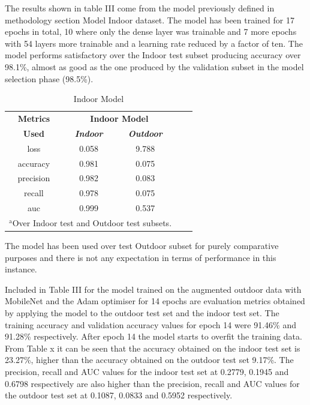 \documentclass[conference]{IEEEtran}
\begin{document}
The results shown in table III come from the model previously defined in methodology section Model Indoor dataset. The model has been trained for 17 epochs in total, 10 where only the dense layer was trainable and 7 more epochs with 54 layers more trainable and a learning rate reduced by a factor of ten. The model performs satisfactory over the Indoor test subset producing accuracy over 98.1\%, almost as good as the one produced by the validation subset in the model selection phase (98.5\%).   

\begin{table}[htbp]
\caption{Indoor Model}
\begin{center}
\begin{tabular}{|c|c|c|c|c|}
\hline
\textbf{Metrics}&\multicolumn{2}{|c|}{\textbf{Indoor Model}} \\
\cline{2-3} 
\textbf{Used} & \textbf{\textit{Indoor}}& \textbf{\textit{Outdoor}} \\
\hline
loss &0.058&9.788  \\
\hline
accuracy &0.981&0.075 \\
\hline
precision &0.982&0.083 \\
\hline
recall &0.978&0.075 \\
\hline
auc &0.999&0.537  \\
\hline
\multicolumn{3}{l}{$^{\mathrm{a}}$Over Indoor test and Outdoor test subsets.}
\end{tabular}
\label{tab1}
\end{center}
\end{table}
The model has been used over test Outdoor subset for purely comparative purposes and there is not any expectation in terms of performance in this instance.

Included in Table III for the model trained on the augmented outdoor data with MobileNet and the Adam optimiser for 14 epochs are evaluation metrics obtained by applying the model to the outdoor test set and the indoor test set. The training accuracy and validation accuracy values for epoch 14 were 91.46\% and 91.28\% respectively. After epoch 14 the model starts to overfit the training data. From Table x it can be seen that the accuracy obtained on the indoor test set is 23.27\%, higher than the accuracy obtained on the outdoor test set 9.17\%. The precision, recall and AUC values for the indoor test set at 0.2779, 0.1945 and 0.6798 respectively are also higher than the precision, recall and AUC values for the outdoor test set at  0.1087, 0.0833 and 0.5952 respectively.\
 
\end{document}
